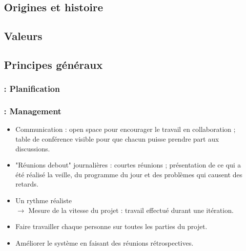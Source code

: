 \begin{frame}
\tableofcontents

\end{frame}
    
\subsection{Origines et histoire}
\begin{frame}
\frametitle{\insertsubsection}
\end{frame}

\subsection{Valeurs}
\begin{frame}
\frametitle{\insertsubsection}
\end{frame}

\subsection{Principes généraux}
\begin{frame}
\frametitle{\insertsubsection : Planification}

\end{frame}

\begin{frame}
\frametitle{\insertsubsection : Management}
\begin{itemize}
\item Communication : open space pour encourager le travail en collaboration ; table de conférence visible pour que chacun puisse prendre part aux discussions.

\item "Réunions debout" journalières : courtes réunions ; présentation de ce qui a été réalisé la veille, du programme du jour et des problèmes qui causent des retards.

\item Un rythme réaliste \\
$\longrightarrow$ Mesure de la vitesse du projet : travail effectué durant une itération.

\item Faire travailler chaque personne sur toutes les parties du projet.

\item Améliorer le système en faisant des réunions rétrospectives.

\end{itemize}

\end{frame}

